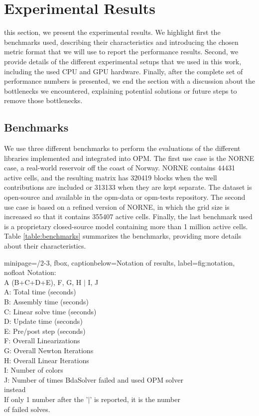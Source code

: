 \section{Experimental Results}
\label{sec:experimentalresults}

 this section, we present the experimental results. We highlight first the benchmarks used, describing their characteristics and introducing the chosen metric format that we will use to report the performance results. Second, we provide details of the different experimental setups that we used in this work, including the used CPU and GPU hardware. Finally, after the complete set of performance numbers is presented, we end the section with a discussion about the bottlenecks we encountered, explaining potential solutions or future steps to remove those bottlenecks.  

\subsection{Benchmarks}

We use three different benchmarks to perform the evaluations of the different libraries implemented and integrated into OPM. The first use case is the NORNE\cite{norne} case, a real-world reservoir off the coast of Norway. NORNE contains 44431 active cells, and the resulting matrix has 320419 blocks when the well contributions are included or 313133 when they are kept separate. The dataset is open-source and available in the opm-data or opm-tests repository. The second use case is based on a refined version of NORNE, in which the grid size is increased so that it contains 355407 active cells. Finally, the last benchmark used is a proprietary closed-source model containing more than 1 million active cells. Table \ref{table:benchmarks} summarizes the benchmarks, providing more details about their characteristics.
\vspace{10pt}
\begin{adjustbox}{minipage=\textwidth/2-3\fboxrule, fbox, captionbelow={Notation of results}, label={fig:notation}, nofloat}
Notation: \\
A (B+C+D+E), F, G, H $|$ I, J \\
A: Total time (seconds) \\
B: Assembly time (seconds) \\
C: Linear solve time (seconds) \\
D: Update time (seconds) \\
E: Pre/post step (seconds) \\
F: Overall Linearizations \\
G: Overall Newton Iterations \\
H: Overall Linear Iterations \\
I: Number of colors \\
J: Number of times BdaSolver failed and used OPM solver \\ instead \\
If only 1 number after the '$|$' is reported, it is the number \\ of failed solves.
\end{adjustbox}
\vspace{10pt}

